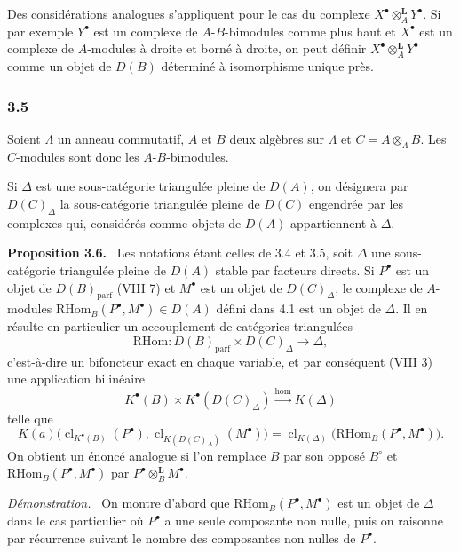 \documentclass[11pt]{article}
\newenvironment{statement}[1]{\par\medskip\noindent\textbf{#1.}\ }{\par\medskip}
\newenvironment{prooftext}[1][Proof]{\par\noindent\emph{#1.}\ }{\par\medskip}
\newcommand{\R}{\mathrm{R}}\newcommand{\RHomCore}{\mathrm{RHom}}
\providecommand{\RHom}{\RHomCore}
\providecommand{\cl}{\operatorname{cl}}
\providecommand{\parf}{\mathrm{parf}}
\providecommand{\RHom}{\RHomCore}
\providecommand{\RHom}{\R\mathcal{H}om}
\providecommand{\R}{\mathrm R}
\providecommand{\cl}{\operatorname{cl}}
\providecommand{\parf}{\mathrm{parf}}
\providecommand{\RHom}{\RHomCore}
\providecommand{\cl}{\operatorname{cl}}
\begin{document}
Des considérations analogues s'appliquent pour le cas du complexe $X^\bullet\otimes_A^{\mathbf L}Y^\bullet$. Si par exemple $Y^\bullet$ est un complexe de $A$-$B$-bimodules comme plus haut et $X^\bullet$ est un complexe de $A$-modules à droite et borné à droite, on peut définir $X^\bullet\otimes_A^{\mathbf L}Y^\bullet$ comme un objet de $D(B)$ déterminé à isomorphisme unique près.

\subsubsection*{3.5}

Soient $\Lambda$ un anneau commutatif, $A$ et $B$ deux algèbres sur $\Lambda$ et $C=A\otimes_{\Lambda}B$. Les $C$-modules sont donc les $A$-$B$-bimodules.

Si $\Delta$ est une sous-catégorie triangulée pleine de $D(A)$, on désignera par $D(C)_{\Delta}$ la sous-catégorie triangulée pleine de $D(C)$ engendrée par les complexes qui, considérés comme objets de $D(A)$ appartiennent à $\Delta$.

\begin{statement}{Proposition 3.6}
Les notations étant celles de 3.4 et 3.5, soit $\Delta$ une sous-catégorie triangulée pleine de $D(A)$ stable par facteurs directs. Si $P^\bullet$ est un objet de $D(B)_{\parf}$ (VIII 7) et $M^\bullet$ est un objet de $D(C)_{\Delta}$, le complexe de $A$-modules $\RHom_B(P^\bullet,M^\bullet)\in D(A)$ défini dans 4.1 est un objet de $\Delta$. Il en résulte en particulier un accouplement de catégories triangulées
\[
\RHom:D(B)_{\parf}\times D(C)_{\Delta}\longrightarrow \Delta,
\tag{3.6.1}
\]
c'est-à-dire un bifoncteur exact en chaque variable, et par conséquent (VIII 3) une application bilinéaire
\[
K^{\bullet}(B)\times K^{\bullet}(D(C)_{\Delta})\xrightarrow{\operatorname{hom}} K(\Delta)
\tag{3.6.2}
\]
telle que
\[
K(a)\bigl(\cl_{K^{\bullet}(B)}(P^\bullet),\cl_{K(D(C)_{\Delta})}(M^\bullet)\bigr)
=\cl_{K(\Delta)}\bigl(\RHom_B(P^\bullet,M^\bullet)\bigr).
\tag{3.6.3}
\]
On obtient un énoncé analogue si l'on remplace $B$ par son opposé $B^\circ$ et $\RHom_B(P^\bullet,M^\bullet)$ par $P^\bullet\otimes_B^{\mathbf L}M^\bullet$.
\end{statement}

\begin{prooftext}[Démonstration]
On montre d'abord que $\RHom_B(P^\bullet,M^\bullet)$ est un objet de $\Delta$ dans le cas particulier où $P^\bullet$ a une seule composante non nulle, puis on raisonne par récurrence suivant le nombre des composantes non nulles de $P^\bullet$.
\end{prooftext}
\end{document}
